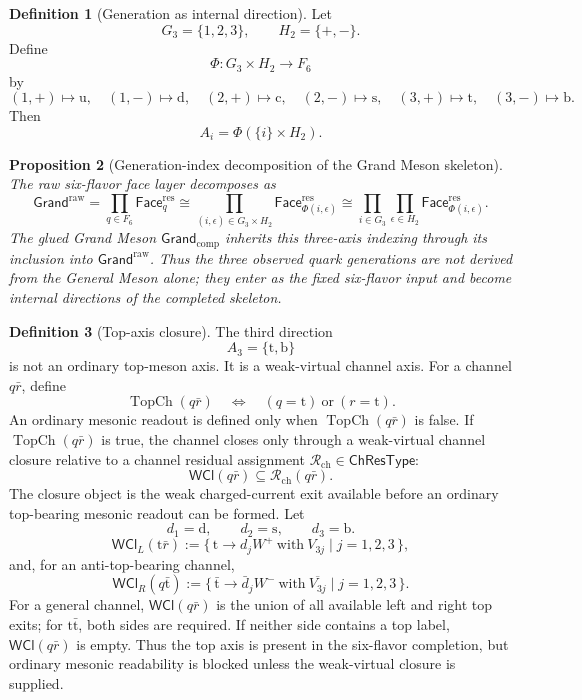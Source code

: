 \documentclass[11pt]{article}
\theoremstyle{definition}
\newtheorem{definition}{Definition}
\theoremstyle{plain}
\newtheorem{proposition}[definition]{Proposition}
\DeclareMathOperator{\TopCh}{TopCh}
\newcommand{\qu}{\mathrm u}
\newcommand{\qd}{\mathrm d}
\newcommand{\qc}{\mathrm c}
\newcommand{\qs}{\mathrm s}
\newcommand{\qt}{\mathrm t}
\newcommand{\qb}{\mathrm b}
\begin{document}
\begin{definition}[Generation as internal direction]
Let
\[
  G_3=\{1,2,3\},
  \qquad
  H_2=\{+,-\}.
\]
Define
\[
  \Phi:G_3\times H_2\longrightarrow F_6
\]
by
\[
  (1,+)\mapsto\qu,\quad (1,-)\mapsto\qd,\quad
  (2,+)\mapsto\qc,\quad (2,-)\mapsto\qs,\quad
  (3,+)\mapsto\qt,\quad (3,-)\mapsto\qb .
\]
Then
\[
  A_i=\Phi(\{i\}\times H_2).
\]
\end{definition}

\begin{proposition}[Generation-index decomposition of the Grand Meson skeleton]
The raw six-flavor face layer decomposes as
\[
  \mathsf{Grand}^{\mathrm{raw}}
  =
  \prod_{q\in F_6}\mathsf{Face}^{\mathrm{res}}_q
  \cong
  \prod_{(i,\epsilon)\in G_3\times H_2}
  \mathsf{Face}^{\mathrm{res}}_{\Phi(i,\epsilon)}
  \cong
  \prod_{i\in G_3}\prod_{\epsilon\in H_2}
  \mathsf{Face}^{\mathrm{res}}_{\Phi(i,\epsilon)}.
\]
The glued Grand Meson \(\mathsf{Grand}_{\mathrm{comp}}\) inherits this
three-axis indexing through its inclusion into
\(\mathsf{Grand}^{\mathrm{raw}}\).  Thus the three observed quark
generations are not derived from the General Meson alone; they enter as
the fixed six-flavor input and become internal directions of the completed
skeleton.
\end{proposition}

\begin{definition}[Top-axis closure]
The third direction
\[
  A_3=\{\qt,\qb\}
\]
is not an ordinary top-meson axis.  It is a weak-virtual channel axis.
For a channel \(q\bar r\), define
\[
  \TopCh(q\bar r)
  \quad\Longleftrightarrow\quad
  (q=\qt)\ \text{or}\ (r=\qt).
\]
An ordinary mesonic readout is defined only when \(\TopCh(q\bar r)\) is
false.  If \(\TopCh(q\bar r)\) is true, the channel closes only through a
weak-virtual channel closure relative to a channel residual assignment
\(\mathcal R_{\mathrm{ch}}\in\mathsf{ChResType}\):
\[
  \mathsf{WCl}(q\bar r)\subseteq\mathcal R_{\mathrm{ch}}(q\bar r).
\]
The closure object is the weak charged-current exit available before an
ordinary top-bearing mesonic readout can be formed.  Let
\[
  d_1=\qd,\qquad d_2=\qs,\qquad d_3=\qb .
\]
\[
  \mathsf{WCl}_{L}(\qt\bar r)
  :=
  \{\,\qt\to d_j W^+\ \mathrm{with}\ V_{3j}\mid j=1,2,3\,\},
\]
and, for an anti-top-bearing channel,
\[
  \mathsf{WCl}_{R}(q\bar{\qt})
  :=
  \{\,\bar{\qt}\to\bar d_j W^-\ \mathrm{with}\ \overline{V_{3j}}
    \mid j=1,2,3\,\}.
\]
For a general channel, \(\mathsf{WCl}(q\bar r)\) is the union of all
available left and right top exits; for \(\qt\bar{\qt}\), both sides are
required.  If neither side contains a top label, \(\mathsf{WCl}(q\bar r)\)
is empty.
Thus the top axis is present in the six-flavor completion, but ordinary
mesonic readability is blocked unless the weak-virtual closure is supplied.
\end{definition}
\end{document}
